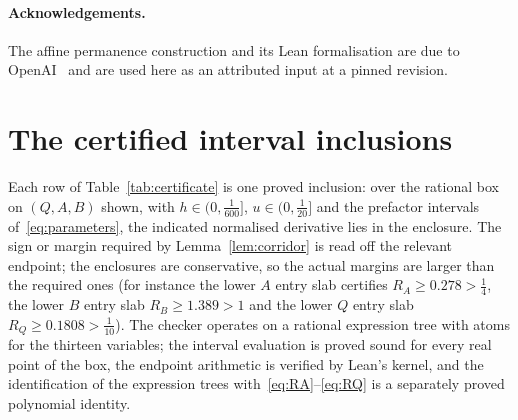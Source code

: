 \documentclass[11pt,a4paper]{article}
\theoremstyle{plain}
\theoremstyle{definition}
\theoremstyle{remark}
\begin{document}
\paragraph{Acknowledgements.}
The affine permanence construction and its Lean formalisation are due to OpenAI~\cite{OpenAI2026Uniform,OpenAI2026Boundedness,OpenAI2026Formal} and are used here as an attributed input at a pinned revision.

\appendix
\section{The certified interval inclusions}
\label{app:certificate}
Each row of Table~\ref{tab:certificate} is one proved inclusion: over the rational box on $(Q,A,B)$ shown, with $h\in(0,\tfrac1{600}]$, $u\in(0,\tfrac1{20}]$ and the prefactor intervals of~\eqref{eq:parameters}, the indicated normalised derivative lies in the enclosure. The sign or margin required by Lemma~\ref{lem:corridor} is read off the relevant endpoint; the enclosures are conservative, so the actual margins are larger than the required ones (for instance the lower $A$ entry slab certifies $R_A\ge0.278>\tfrac14$, the lower $B$ entry slab $R_B\ge1.389>1$ and the lower $Q$ entry slab $R_Q\ge0.1808>\tfrac1{10}$). The checker operates on a rational expression tree with atoms for the thirteen variables; the interval evaluation is proved sound for every real point of the box, the endpoint arithmetic is verified by Lean's kernel, and the identification of the expression trees with~\eqref{eq:RA}--\eqref{eq:RQ} is a separately proved polynomial identity.
\end{document}
